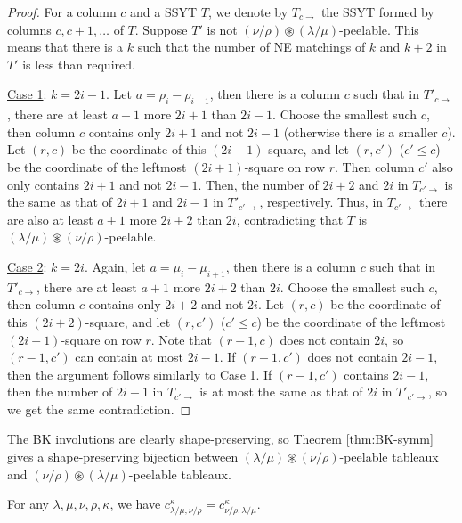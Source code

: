 \documentclass[ALCO,Unicode]{cedram}
\begin{document}
    \begin{proof}
        For a column $c$ and a SSYT $T$, we denote by $T_{c\rightarrow}$ the SSYT formed by columns $c,c+1,\ldots$ of $T$. Suppose $T'$ is not $(\nu/\rho)\circledast(\lambda/\mu)$-peelable. This means that there is a $k$ such that the number of NE matchings of $k$ and $k+2$ in $T'$ is less than required.

        \underline{Case 1}: $k = 2i-1$. Let $a = \rho_i - \rho_{i+1}$, then there is a column $c$ such that in $T'_{c\rightarrow}$, there are at least $a+1$ more $2i+1$ than $2i-1$. Choose the smallest such $c$, then column $c$ contains only $2i+1$ and not $2i-1$ (otherwise there is a smaller $c$). Let $(r,c)$ be the coordinate of this $(2i+1)$-square, and let $(r,c')$ ($c'\leq c$) be the coordinate of the leftmost $(2i+1)$-square on row $r$. Then column $c'$ also only contains $2i+1$ and not $2i-1$. Then, the number of $2i+2$ and $2i$ in $T_{c'\rightarrow}$ is the same as that of $2i+1$ and $2i-1$ in $T'_{c'\rightarrow}$, respectively. Thus, in $T_{c'\rightarrow}$ there are also at least $a+1$ more $2i+2$ than $2i$, contradicting that $T$ is $(\lambda/\mu)\circledast(\nu/\rho)$-peelable.

        \underline{Case 2}: $k = 2i$. Again, let $a = \mu_i - \mu_{i+1}$, then there is a column $c$ such that in $T'_{c\rightarrow}$, there are at least $a+1$ more $2i+2$ than $2i$. Choose the smallest such $c$, then column $c$ contains only $2i+2$ and not $2i$. Let $(r,c)$ be the coordinate of this $(2i+2)$-square, and let $(r,c')$ ($c'\leq c$) be the coordinate of the leftmost $(2i+1)$-square on row $r$. Note that $(r-1,c)$ does not contain $2i$, so $(r-1,c')$ can contain at most $2i-1$. If $(r-1,c')$ does not contain $2i-1$, then the argument follows similarly to Case 1. If $(r-1,c')$ contains $2i-1$, then the number of $2i-1$ in $T_{c'\rightarrow}$ is at most the same as that of $2i$ in $T'_{c'\rightarrow}$, so we get the same contradiction.
    \end{proof}

    The BK involutions are clearly shape-preserving, so Theorem \ref{thm:BK-symm} gives a shape-preserving bijection between $(\lambda/\mu)\circledast(\nu/\rho)$-peelable tableaux and $(\nu/\rho)\circledast(\lambda/\mu)$-peelable tableaux.

    \begin{coro}
        For any $\lambda,\mu,\nu,\rho,\kappa$, we have $c^{\kappa}_{\lambda/\mu, \nu/\rho} = c^{\kappa}_{\nu/\rho, \lambda/\mu}$.
    \end{coro}
\end{document}

